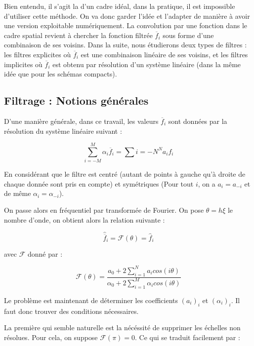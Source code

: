 \documentclass[10pt,a4paper]{amsart}
\begin{document}
Bien entendu, il s'agit la d'un cadre idéal, dans la pratique, il est impossible d'utiliser cette méthode. On va donc garder l'idée et l'adapter de manière à avoir une version exploitable numériquement. La convolution par une fonction dans le cadre spatial revient à chercher la fonction filtrée $\overline{f}_i$ sous forme d'une combinaison de ses voisins. Dans la suite, nous étudierons deux types de filtres : les filtres explicites où $\overline{f}_i$ est une combinaison linéaire de ses voisins, et les filtres implicites où $\overline{f}_i$ est obtenu par résolution d'un système linéaire (dans la même idée que pour les schémas compacts).

\subsection{Filtrage : Notions générales}

D'une manière générale, dans ce travail, les valeurs $\overline{f}_i$ sont données par la résolution du système linéaire suivant :

\begin{equation}
  \label{filtre general}
  \sum_{i=-M}^M \alpha_i \overline{f}_{i} = \sum{i=-N}^N a_i f_i
\end{equation}

En considérant que le filtre est centré (autant de points à gauche qu'à droite de chaque donnée sont pris en compte) et symétriques (Pour tout $i$, on a $a_i = a_{-i}$ et de même $\alpha_i = \alpha_{-i}$).

On passe alors en fréquentiel par transformée de Fourier. On pose $\theta = h \xi$ le nombre d'onde, on obtient alors la relation suivante :

\begin{equation}
  \label{filtre frequentiel}
  \widehat{\overline{f}}_i = \mathcal{F} ( \theta ) = \widehat{f}_i
\end{equation}

avec $\mathcal{F}$ donné par :

$$\mathcal{F} ( \theta ) = \dfrac{a_0 + 2 \sum_{i=1}^N  a_i  cos ( i \theta ) }{\alpha_0 + 2 \sum_{i=1}^M \alpha_i cos ( i \theta )}$$

Le problème est maintenant de déterminer les coefficients $(a_i)_i$ et $(\alpha_i)_i$. Il faut donc trouver des conditions nécessaires.

La première qui semble naturelle est la nécéssité de supprimer les échelles non résolues. Pour cela, on suppose $\mathcal{F}(\pi) = 0$. Ce qui se traduit facilement par :
\end{document}
